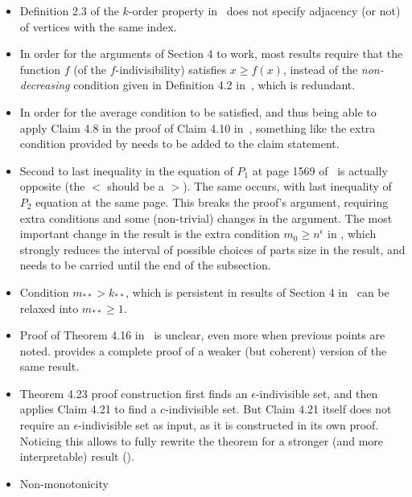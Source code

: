     \begin{itemize}
        \item Definition 2.3 of the $k$-order property in~\cite{regularity_lemmas_for_stable_graphs} does not
            specify adjacency (or not) of vertices with the same index.
        \item In order for the arguments of Section 4 to work, most results require that the function
            $f$ (of the $f$-indivisibility) satisfies $x \geq f(x)$, instead of the \emph{non-decreasing} condition
            given in Definition 4.2 in~\cite{regularity_lemmas_for_stable_graphs}, which is redundant.
        \item In order for the average condition to be satisfied, and thus being able to apply Claim 4.8 in the proof
            of Claim 4.10 in~\cite{regularity_lemmas_for_stable_graphs}, something like the extra condition provided
            by  needs to be added to the claim statement.
        \item Second to last inequality in the equation of $P_1$ at page 1569 of~\cite{regularity_lemmas_for_stable_graphs}
            is actually opposite (the $<$ should be a $>$).
            The same occurs, with last inequality of $P_2$ equation at the same page.
            This breaks the proof's argument, requiring extra conditions and some (non-trivial) changes in the argument.
            The most important change in the result is the extra condition $m_0 \geq n^\epsilon$ in
            , which strongly reduces the
            interval of possible choices of parts size in the result, and needs to be carried until the end of the subsection.
        \item Condition $m_{**} > k_{**}$, which is persistent in results of Section 4
            in~\cite{regularity_lemmas_for_stable_graphs} can be relaxed into $m_{**} \geq 1$.
        \item Proof of Theorem 4.16 in~\cite{regularity_lemmas_for_stable_graphs} is unclear, even more when previous points
            are noted.
             provides
            a complete proof of a weaker (but coherent) version of the same result.
        \item Theorem 4.23 proof construction first finds an $\epsilon$-indivisible set, and then applies Claim 4.21
            to find a $c$-indivisible set.
            But Claim 4.21 itself does not require an $\epsilon$-indivisible set as input, as it is constructed in its
            own proof.
            Noticing this allows to fully rewrite the theorem for a stronger (and more interpretable) result
            ().
        \item Non-monotonicity

    \end{itemize}

